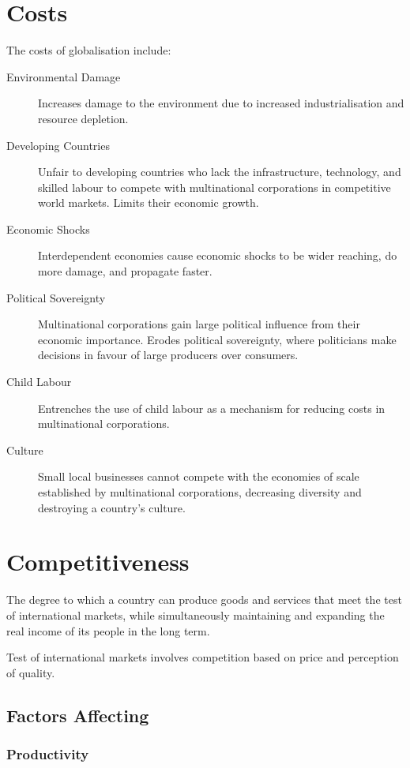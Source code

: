 \documentclass[a4paper,11pt]{article}
\begin{document}
\section{Costs}

The costs of globalisation include:

\begin{description}
\item [Environmental Damage] Increases damage to the environment due to
	increased industrialisation and resource depletion.
\item [Developing Countries] Unfair to developing countries who lack the
	infrastructure, technology, and skilled labour to compete with multinational
	corporations in competitive world markets. Limits their economic growth.
\item [Economic Shocks] Interdependent economies cause economic shocks to be
	wider reaching, do more damage, and propagate faster.
\item [Political Sovereignty] Multinational corporations gain large political
	influence from their economic importance. Erodes political sovereignty,
	where politicians make decisions in favour of large producers over
	consumers.
\item [Child Labour] Entrenches the use of child labour as a mechanism for
	reducing costs in multinational corporations.
\item [Culture] Small local businesses cannot compete with the economies of
	scale established by multinational corporations, decreasing diversity
	and destroying a country's culture.
\end{description}



\section{Competitiveness}

The degree to which a country can produce goods and services that meet the
test of international markets, while simultaneously maintaining and expanding
the real income of its people in the long term.

Test of international markets involves competition based on price and
perception of quality.


\subsection{Factors Affecting}

\subsubsection{Productivity}
\end{document}
